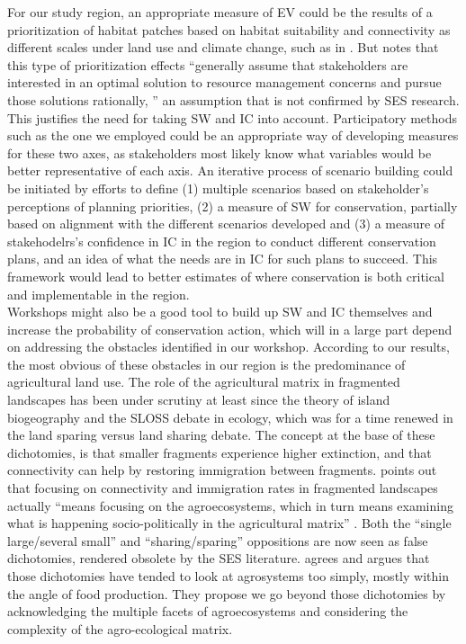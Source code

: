 \documentclass[12pt,Bold,TexShade]{thesis/mcgilletdclass}
\begin{document}
{For our study region, an appropriate measure of EV could be the results of a prioritization of habitat patches based on habitat suitability and connectivity as different scales under land use and climate change, such as in \cite{albert_applying_2017}. But \citeauthor{williamson_spatially_2018} notes that this type of prioritization effects “generally assume that stakeholders are interested in an optimal solution to resource management concerns and pursue those solutions rationally, ” an assumption that is not confirmed by SES research. This justifies the need for taking SW and IC into account. Participatory methods such as the one we employed could be an appropriate way of developing measures for these two axes, as stakeholders most likely know what variables would be better representative of each axis. An iterative process of scenario building could be initiated by efforts to define (1) multiple scenarios based on stakeholder’s perceptions of planning priorities, (2) a measure of SW for conservation, partially based on alignment with the different scenarios developed and (3) a measure of stakehodelrs’s confidence in IC in the region to conduct different conservation plans, and an idea of what the needs are in IC for such plans to succeed. This framework would lead to better estimates of where conservation is both critical and implementable in the region. \\

Workshops might also be a good tool to build up SW and IC themselves and increase the probability of conservation action, which will in a large part depend on addressing the obstacles identified in our workshop. According to our results, the most obvious of these obstacles in our region is the predominance of agricultural land use. The role of the agricultural matrix in fragmented landscapes has been under scrutiny at least since the theory of island biogeography and the SLOSS debate in ecology, which was for a time renewed in the land sparing versus land sharing debate. The concept at the base of these dichotomies, is that smaller fragments experience higher extinction, and that connectivity can help by restoring immigration between fragments. \cite{perfecto_natures_2019} points out that focusing on connectivity and immigration rates in fragmented landscapes actually “means focusing on the agroecosystems, which in turn means examining what is happening socio-politically in the agricultural matrix” \citep{perfecto_natures_2019}. Both the “single large/several small” and “sharing/sparing” oppositions are now seen as false dichotomies, rendered obsolete by the SES literature. \cite{bennett_changing_2017} agrees and argues that those dichotomies have tended to look at agrosystems too simply, mostly within the angle of food production. They propose we go beyond those dichotomies by acknowledging the multiple facets of agroecosystems and considering the complexity of the agro-ecological matrix. \\

}
\end{document}
